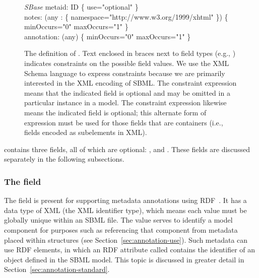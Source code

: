 \begin{figure}[hbt]
  \centering
  \begin{classbox}{\textsl{SBase}}
    metaid: ID \{ use="optional" \}                                                                 \\
    notes: (any : \{ namespace="http://www.w3.org/1999/xhtml" \}) \{ minOccurs="0" maxOccurs="1" \} \\
    annotation: (any) \{ minOccurs="0" maxOccurs="1" \}                                             \\
  \end{classbox}
  \caption{The definition of \SBase.  Text enclosed in braces next
    to field types (e.g., ) indicates
    constraints on the possible field values.  We use the XML Schema
    language to express constraints because we are primarily interested in
    the XML encoding of SBML.  The constraint expression
     means that the indicated field is optional
    and may be omitted in a particular instance in a model.  The constraint
    expression  likewise means the indicated
    field is optional; this alternate form of expression must be used for
    those fields that are containers (i.e., fields encoded as
    subelements in XML).}
  \label{fig:sbase}
\end{figure}

\SBase contains three fields, all of which are optional:
,  and . These
fields are discussed separately in the following subsections.


\subsubsection{The  field}
\label{sec:metaid}

The  field is present for supporting metadata
annotations using RDF~\citep[Resource Description
Format;][]{lassila:1999}.  It has a data type of XML 
(the XML identifier type), which means each  value
must be globally unique within an SBML file.  The 
value serves to identify a model component for purposes such as
referencing that component from metadata placed within
 structures (see
Section~\ref{sec:annotation-use}).  Such metadata can use RDF
 elements, in which an RDF attribute called
 contains the  identifier of an
object defined in the SBML model.  This topic is discussed in
greater detail in Section~\ref{sec:annotation-standard}.


